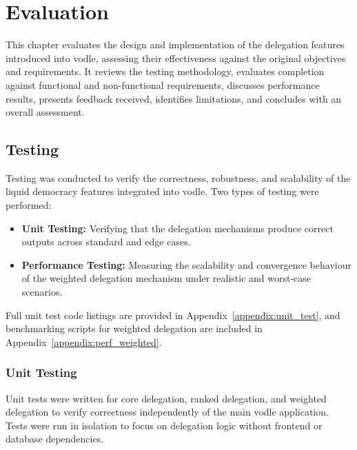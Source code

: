 \chapter{Evaluation}\label{ch:evaluation}

This chapter evaluates the design and implementation of the delegation features introduced into vodle, assessing their effectiveness against the original objectives and requirements. It reviews the testing methodology, evaluates completion against functional and non-functional requirements, discusses performance results, presents feedback received, identifies limitations, and concludes with an overall assessment.

\section{Testing}
Testing was conducted to verify the correctness, robustness, and scalability of the liquid democracy features integrated into vodle. Two types of testing were performed:
\begin{itemize}
    \item \textbf{Unit Testing:} Verifying that the delegation mechanisms produce correct outputs across standard and edge cases.
    \item \textbf{Performance Testing:} Measuring the scalability and convergence behaviour of the weighted delegation mechanism under realistic and worst-case scenarios.
\end{itemize}
Full unit test code listings are provided in Appendix~\ref{appendix:unit_test}, and benchmarking scripts for weighted delegation are included in Appendix~\ref{appendix:perf_weighted}.

\subsection{Unit Testing}
Unit tests were written for core delegation, ranked delegation, and weighted delegation to verify correctness independently of the main vodle application. Tests were run in isolation to focus on delegation logic without frontend or database dependencies.

